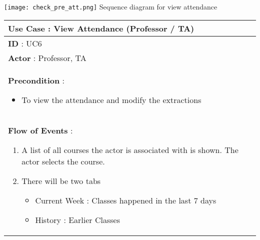 \documentclass[paper=a4, fontsize=15pt]{scrartcl}
\begin{document}
  \begin{center}
\texttt{[image: check\_pre\_att.png]}
 {\Large Sequence diagram for view attendance}
\end{center}
 
 
 
 
 


\begin{tabular}{|p{36em}|} 
 \hline
 \textbf{Use Case : View Attendance (Professor / TA)}\\
 \hline
 \textbf{ID } : UC6\\
 \hline
 \textbf{Actor }: Professor, TA\\
 \hline
 \textbf{Precondition }:
 \begin{itemize}[topsep=0pt]
     \item To view the attendance and modify the extractions
 \end{itemize}\\
 \hline
 \textbf{Flow of Events }:
 \begin{enumerate}[topsep=0pt]
     \item A list of all courses the actor is associated with is shown. The actor selects the course.
     \item There will be two tabs
     \begin{itemize}[topsep=0pt]
         \item  Current Week : Classes happened in the last 7 days
         \item  History : Earlier Classes
     \end{itemize} 
         

\end{enumerate}
\end{tabular}
\end{document}
